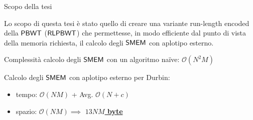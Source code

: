 \documentclass[]{beamer}
\def\SLP{\mbox{\rm {\sf SLP}}}
\def\LCE{\mbox{\rm {\sf LCE}}}
\def\LF{\mbox{\rm {\sf LF}}}
\def\IISA{\mbox{\rm {\sf (I)SA}}}
\def\PPLCP{\mbox{\rm {\sf (P)LCP}}}
\def\RLBWT{\mbox{\rm {\sf RLBWT}}}
\def\MEM{\mbox{\rm {\sf MEM}}}
\def\MS{\mbox{\rm {\sf MS}}}
\def\BWT{\mbox{\rm {\sf BWT}}}
\def\PBWT{\mbox{\rm {\sf PBWT}}}
\def\RLPBWT{\mbox{\rm {\sf RLPBWT}}}
\def\SMEM{\mbox{\rm {\sf SMEM}}}
\def\LCE{\mbox{\rm {\sf LCE}}}
\begin{document}
\begin{frame}{Scopo della tesi}
   \begin{alertblock}{}
    Lo scopo di questa tesi è stato quello di creare
    una variante run-length encoded della $\PBWT$ ($\RLPBWT$) che permettesse,
    in modo efficiente dal 
    punto di vista della memoria richiesta, il calcolo degli $\SMEM$ con
    aplotipo esterno. 
  \end{alertblock}
  \begin{block}{}
    Complessità calcolo degli $\SMEM$ con un algoritmo na\"{i}ve:
    $\mathcal{O}(N^2M)$
  \end{block}
  \begin{block}{}
    Calcolo degli $\SMEM$ con aplotipo esterno per Durbin:
    \begin{itemize}
      \item tempo: $\mathcal{O}(\mathit{NM})$ + Avg. $\mathcal{O}(N+c)$
      \item spazio: $\mathcal{O}(\mathit{NM})\implies$
      \underline{\textbf{$13\mathit{NM}$ byte}}
    \end{itemize}
  \end{block}
 
\end{frame}
\end{document}
